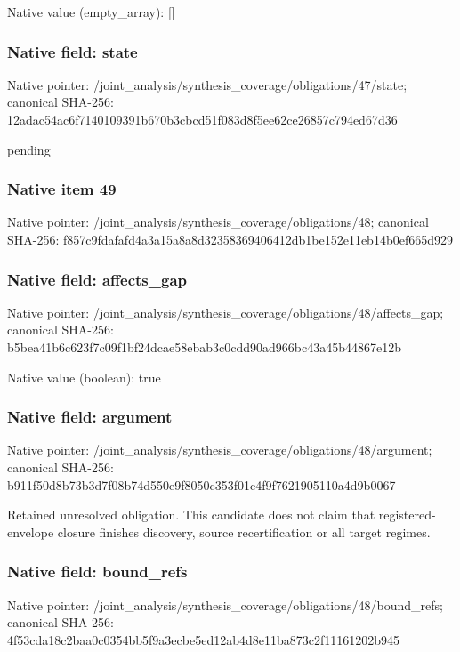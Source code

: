 \documentclass[10pt,a4paper]{article}
\begin{document}
Native value (empty\_\allowbreak{}array): []

\subsubsection{Native field: state}
Native pointer: /joint\_\allowbreak{}analysis/synthesis\_\allowbreak{}coverage/obligations/47/state; canonical SHA-256: 12adac54ac6f7140109391b670b3cbcd51f083d8f5ee62ce26857c794ed67d36

\begingroup\raggedright\sloppy pending\par\endgroup

\subsubsection{Native item 49}
Native pointer: /joint\_\allowbreak{}analysis/synthesis\_\allowbreak{}coverage/obligations/48; canonical SHA-256: f857c9fdafafd4a3a15a8a8d32358369406412db1be152e11eb14b0ef665d929

\subsubsection{Native field: affects\_\allowbreak{}gap}
Native pointer: /joint\_\allowbreak{}analysis/synthesis\_\allowbreak{}coverage/obligations/48/affects\_\allowbreak{}gap; canonical SHA-256: b5bea41b6c623f7c09f1bf24dcae58ebab3c0cdd90ad966bc43a45b44867e12b

Native value (boolean): true

\subsubsection{Native field: argument}
Native pointer: /joint\_\allowbreak{}analysis/synthesis\_\allowbreak{}coverage/obligations/48/argument; canonical SHA-256: b911f50d8b73b3d7f08b74d550e9f8050c353f01c4f9f7621905110a4d9b0067

\begingroup\raggedright\sloppy Retained unresolved obligation. This candidate does not claim that registered-envelope closure finishes discovery,\allowbreak{} source recertification or all target regimes.\par\endgroup

\subsubsection{Native field: bound\_\allowbreak{}refs}
Native pointer: /joint\_\allowbreak{}analysis/synthesis\_\allowbreak{}coverage/obligations/48/bound\_\allowbreak{}refs; canonical SHA-256: 4f53cda18c2baa0c0354bb5f9a3ecbe5ed12ab4d8e11ba873c2f11161202b945
\end{document}
